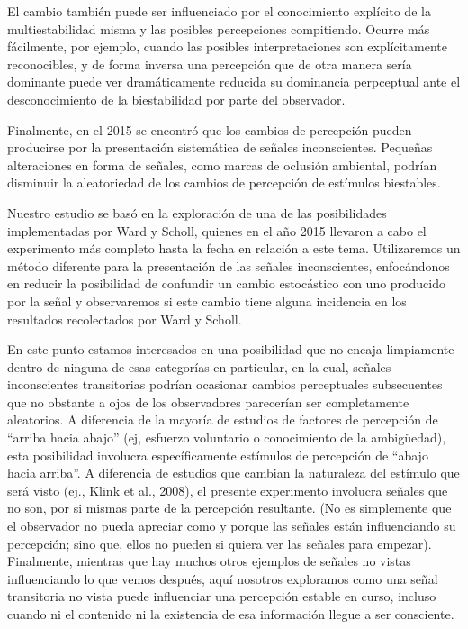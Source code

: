 \documentclass[jou]{apa6}
\begin{document}
El cambio también puede ser influenciado por el conocimiento explícito de la
multiestabilidad misma y las posibles percepciones compitiendo. Ocurre más fácilmente, por
ejemplo, cuando las posibles interpretaciones son explícitamente reconocibles, 
y de forma inversa una percepción que de otra manera sería dominante puede
ver dramáticamente reducida su dominancia perpceptual ante el desconocimiento de la
biestabilidad por parte del observador.

Finalmente, en el 2015 se encontró que los cambios de percepción pueden producirse por
la presentación sistemática de señales inconscientes. Pequeñas alteraciones en forma de
señales, como marcas de oclusión ambiental, podrían disminuir la aleatoriedad de los
cambios de percepción de estímulos biestables.

Nuestro estudio se basó en la exploración de una de las posibilidades implementadas por
Ward y Scholl, quienes en el año 2015 llevaron a cabo el experimento más completo hasta la
fecha en relación a este tema. Utilizaremos un método diferente para la presentación de las
señales inconscientes, enfocándonos en reducir la posibilidad de confundir un cambio
estocástico con uno producido por la señal y observaremos si este cambio tiene alguna
incidencia en los resultados recolectados por Ward y Scholl.

En este punto estamos interesados en una posibilidad que no encaja limpiamente dentro
de ninguna de esas categorías en particular, en la cual, señales inconscientes transitorias
podrían ocasionar cambios perceptuales subsecuentes que no obstante a ojos de los
observadores parecerían ser completamente aleatorios. A diferencia de la mayoría de estudios
de factores de percepción de “arriba hacia abajo” (ej, esfuerzo voluntario o conocimiento de
la ambigüedad), esta posibilidad involucra específicamente estímulos
de percepción de “abajo hacia arriba”. A diferencia de estudios que cambian la naturaleza del
estímulo que será visto (ej., Klink et al., 2008), el presente experimento involucra señales que
no son, por si mismas parte de la percepción resultante. (No es simplemente que el
observador no pueda apreciar como y porque las señales están influenciando su percepción;
sino que, ellos no pueden si quiera ver las señales para empezar). Finalmente, mientras que
hay muchos otros ejemplos de señales no vistas influenciando lo que vemos después, 
aquí nosotros exploramos como una señal transitoria no vista
puede influenciar una percepción estable en curso, incluso cuando ni el contenido ni la
existencia de esa información llegue a ser consciente.
\end{document}
